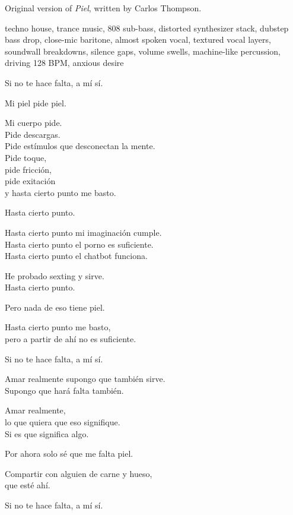 
\label{sec:piel}
\begin{notes}
Original version of \emph{Piel}, written by Carlos Thompson.
\end{notes}
\begin{style}
techno house, trance music, 808 sub-bass, distorted synthesizer stack, dubstep bass drop, close-mic baritone, almost spoken vocal, textured vocal layers, soundwall breakdowns, silence gaps, volume swells, machine-like percussion, driving 128 BPM, anxious desire
\end{style}
\begin{lyrics}
Si no te hace falta, a mí sí.

Mi piel pide piel.

Mi cuerpo pide.\\
Pide descargas.\\
Pide estímulos que desconectan la mente.\\
Pide toque,\\
pide fricción,\\
pide exitación\\
y hasta cierto punto me basto.

Hasta cierto punto.

Hasta cierto punto mi imaginación cumple.\\
Hasta cierto punto el porno es suficiente.\\
Hasta cierto punto el chatbot funciona.

He probado sexting y sirve.\\
Hasta cierto punto.

Pero nada de eso tiene piel.

Hasta cierto punto me basto,\\
pero a partir de ahí no es suficiente.

Si no te hace falta, a mí sí.

Amar realmente supongo que también sirve.\\
Supongo que hará falta también.

Amar realmente,\\
lo que quiera que eso signifique.\\
Si es que significa algo.

Por ahora solo sé que me falta piel.

Compartir con alguien de carne y hueso,\\
que esté ahí.

Si no te hace falta, a mí sí.
\end{lyrics}

